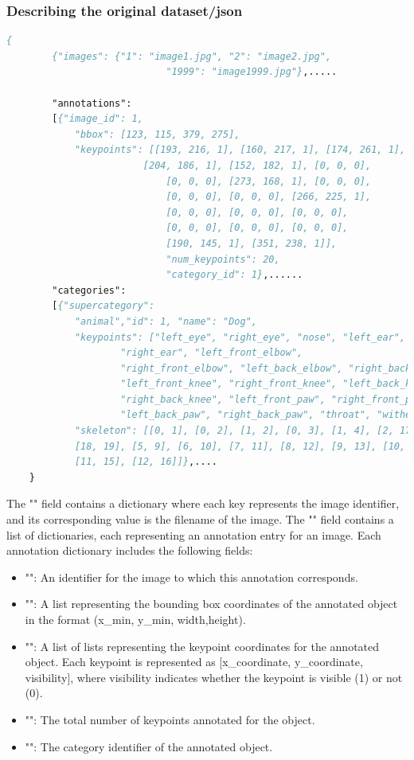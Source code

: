 \subsubsection{Describing the original dataset/json}
\begin{lstlisting}[language=Pascal, caption={Original Json Format}, label={lst:}, basicstyle=\ttfamily\scriptsize, frame=single]
    {
        {"images": {"1": "image1.jpg", "2": "image2.jpg",
                            "1999": "image1999.jpg"},.....

        "annotations":
        [{"image_id": 1, 
            "bbox": [123, 115, 379, 275], 
            "keypoints": [[193, 216, 1], [160, 217, 1], [174, 261, 1],
                        [204, 186, 1], [152, 182, 1], [0, 0, 0], 
                            [0, 0, 0], [273, 168, 1], [0, 0, 0], 
                            [0, 0, 0], [0, 0, 0], [266, 225, 1], 
                            [0, 0, 0], [0, 0, 0], [0, 0, 0], 
                            [0, 0, 0], [0, 0, 0], [0, 0, 0], 
                            [190, 145, 1], [351, 238, 1]], 
                            "num_keypoints": 20, 
                            "category_id": 1},...... 
        "categories":
        [{"supercategory": 
            "animal","id": 1, "name": "Dog", 
            "keypoints": ["left_eye", "right_eye", "nose", "left_ear",
                    "right_ear", "left_front_elbow",
                    "right_front_elbow", "left_back_elbow", "right_back_elbow",
                    "left_front_knee", "right_front_knee", "left_back_knee", 
                    "right_back_knee", "left_front_paw", "right_front_paw", 
                    "left_back_paw", "right_back_paw", "throat", "withers", "tailbase"], 
            "skeleton": [[0, 1], [0, 2], [1, 2], [0, 3], [1, 4], [2, 17], 
            [18, 19], [5, 9], [6, 10], [7, 11], [8, 12], [9, 13], [10, 14], 
            [11, 15], [12, 16]]},....
    }
\end{lstlisting}
\newpage
The "" field contains a dictionary where each key represents the image identifier, and its corresponding value is the filename of the image.\newline
The "" field contains a list of dictionaries, each representing an annotation entry for an image. Each annotation dictionary includes the following fields:
\begin{itemize}
    \item "": An identifier for the image to which this annotation corresponds.
    \item "": A list representing the bounding box coordinates of the annotated object in the format (x\_min, y\_min, width,height).
    \item "": A list of lists representing the keypoint coordinates for the annotated object. Each keypoint is represented as [x\_coordinate, y\_coordinate, visibility], where visibility indicates whether the keypoint is visible (1) or not (0).
    \item "": The total number of keypoints annotated for the object.
    \item "": The category identifier of the annotated object.
\end{itemize}
